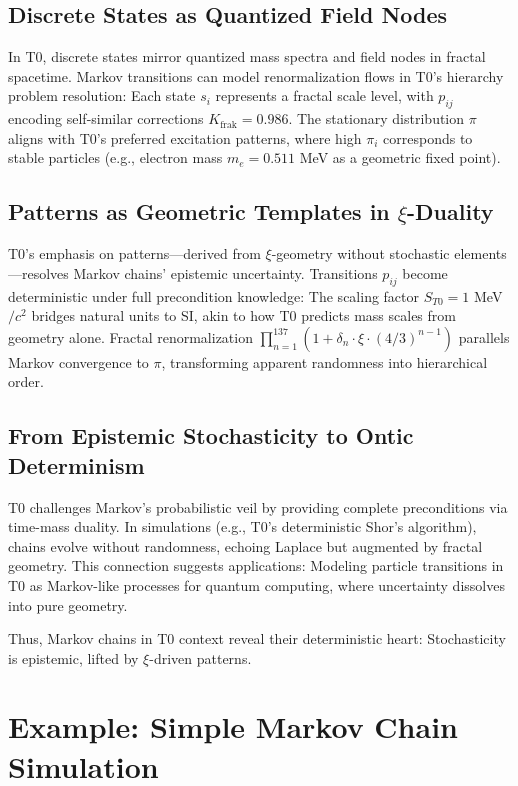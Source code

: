 	\subsection{Discrete States as Quantized Field Nodes}
	In T0, discrete states mirror quantized mass spectra and field nodes in fractal spacetime. Markov transitions can model renormalization flows in T0's hierarchy problem resolution: Each state $s_i$ represents a fractal scale level, with $p_{ij}$ encoding self-similar corrections $K_{\text{frak}} = 0.986$. The stationary distribution $\pi$ aligns with T0's preferred excitation patterns, where high $\pi_i$ corresponds to stable particles (e.g., electron mass $m_e = 0.511$ MeV as a geometric fixed point).
	
	\subsection{Patterns as Geometric Templates in $\xi$-Duality}
	T0's emphasis on patterns—derived from $\xi$-geometry without stochastic elements—resolves Markov chains' epistemic uncertainty. Transitions $p_{ij}$ become deterministic under full precondition knowledge: The scaling factor $S_{T0} = 1$ MeV$/c^2$ bridges natural units to SI, akin to how T0 predicts mass scales from geometry alone. Fractal renormalization $\prod_{n=1}^{137} (1 + \delta_n \cdot \xi \cdot (4/3)^{n-1})$ parallels Markov convergence to $\pi$, transforming apparent randomness into hierarchical order.
	
	\subsection{From Epistemic Stochasticity to Ontic Determinism}
	T0 challenges Markov's probabilistic veil by providing complete preconditions via time-mass duality. In simulations (e.g., T0's deterministic Shor's algorithm), chains evolve without randomness, echoing Laplace but augmented by fractal geometry. This connection suggests applications: Modeling particle transitions in T0 as Markov-like processes for quantum computing, where uncertainty dissolves into pure geometry.
	
	Thus, Markov chains in T0 context reveal their deterministic heart: Stochasticity is epistemic, lifted by $\xi$-driven patterns.
	
	\section{Example: Simple Markov Chain Simulation}
	
